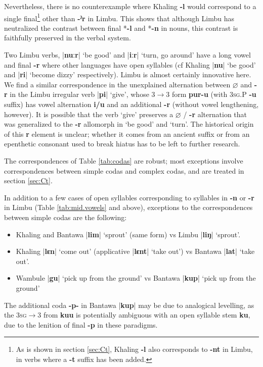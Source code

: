 \documentclass[oldfontcommands,oneside,a4paper,11pt]{article}
\newcommand{\ipa}[1]{\textbf{{\phon\mbox{#1}}}} %
\newcommand{\dhatu}[2]{|\ipa{#1}| `#2'}
\newcommand{\dhat}[1]{|\ipa{#1}|}
\begin{document}
Nevertheless, there is no counterexample where Khaling \ipa{-l} would correspond to a single final\footnote{As is shown in section \ref{sec:Ct}, Khaling \ipa{-l} also corresponds to \ipa{-nt} in Limbu, in verbs where a \ipa{-t} suffix has been added.} other than \ipa{-ˀr} in Limbu. This shows that although Limbu has neutralized the contrast between final *\ipa{-l} and  *\ipa{-n} in nouns, this contrast is faithfully preserved in the verbal system.


Two Limbu verbs, \dhatu{nuːr}{be good} and \dhatu{iːr}{turn, go around} have a long vowel and final \ipa{-r} where other languages have open syllables (cf Khaling \dhatu{nu}{be good} and \dhatu{ri}{become dizzy} respectively). Limbu is almost certainly innovative here. We find a similar correspondence in the unexplained alternation between $\varnothing$ and \ipa{-r} in the Limbu irregular verb \dhatu{pi}{give}, whose 3$\rightarrow$3 form \ipa{pur-u} (with \textsc{3sg.P} \ipa{-u} suffix) has vowel alternation \ipa{i/u} and an additional \ipa{-r} (without vowel lengthening, however). It is possible that the verb `give' preserves a $\varnothing$ / \ipa{-r} alternation that was generalized to the \ipa{-r} allomorph in `be good' and `turn'. The historical origin of this \ipa{r} element is unclear; whether it comes from an ancient suffix or from an epenthetic consonant used to break hiatus has to be left to further research.


The correspondences of Table \ref{tab:codas} are robust; most exceptions involve correspondences between simple codas and complex codas, and are treated in section \ref{sec:Ct}. 

In addition to a few cases of open syllables corresponding to syllables in \ipa{-n} or \ipa{-r} in Limbu (Table \ref{tab:mid.vowels} and above), exceptions to the correspondences between simple codas are the following:

\begin{itemize}
\item Khaling and Bantawa \dhatu{lim}{sprout}	 (same form) vs Limbu	\dhatu{liŋ}{sprout}.
\item Khaling \dhatu{lɛn}{come out} (applicative 	\dhatu{lɛnt}{take out}) vs Bantawa  \dhatu{lat}{take out}.
\item Wambule \dhatu{gu}{pick up from the ground} vs Bantawa \dhatu{kup}{pick up from the ground}
\end{itemize}

The additional coda \ipa{-p-} in Bantawa \dhat{kup} may be due to analogical levelling, as the \textsc{3sg}$\rightarrow$3 from \ipa{kuu} is potentially ambiguous with an open syllable stem \ipa{ku}, due to the lenition of final \ipa{-p} in these paradigms.
\end{document}
